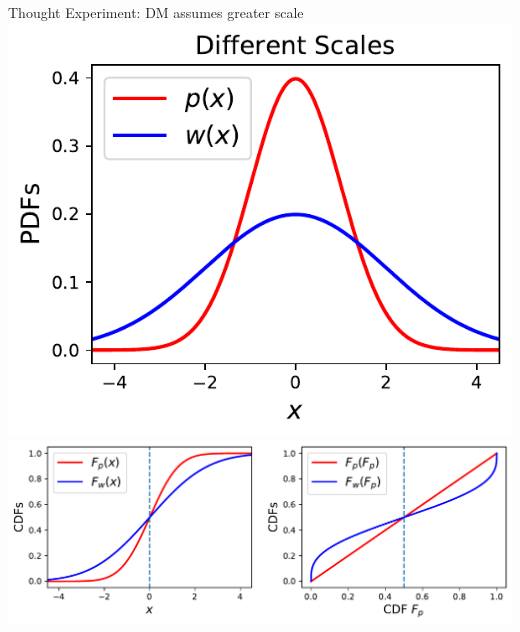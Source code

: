 \begin{frame}{Thought Experiment: DM assumes greater scale}
\centering
	\includegraphics[width=.35\textwidth]{../../figs/2GaussianPDFs2Scales.pdf} \\
	\includegraphics[width=.8\textwidth]{../../figs/mapping_cdfs_noarrows.pdf} \\
\end{frame}

